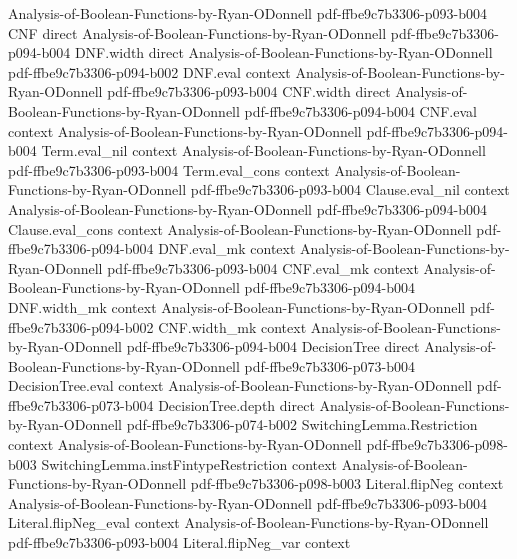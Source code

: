 \begin{theorem}
  {Analysis-of-Boolean-Functions-by-Ryan-ODonnell}
  {pdf-ffbe9c7b3306-p093-b004}
\proofstep
  {CNF}
  {direct}
  {Analysis-of-Boolean-Functions-by-Ryan-ODonnell}
  {pdf-ffbe9c7b3306-p094-b004}
\proofstep
  {DNF.width}
  {direct}
  {Analysis-of-Boolean-Functions-by-Ryan-ODonnell}
  {pdf-ffbe9c7b3306-p094-b002}
\proofstep
  {DNF.eval}
  {context}
  {Analysis-of-Boolean-Functions-by-Ryan-ODonnell}
  {pdf-ffbe9c7b3306-p093-b004}
\proofstep
  {CNF.width}
  {direct}
  {Analysis-of-Boolean-Functions-by-Ryan-ODonnell}
  {pdf-ffbe9c7b3306-p094-b004}
\proofstep
  {CNF.eval}
  {context}
  {Analysis-of-Boolean-Functions-by-Ryan-ODonnell}
  {pdf-ffbe9c7b3306-p094-b004}
\proofstep
  {Term.eval_nil}
  {context}
  {Analysis-of-Boolean-Functions-by-Ryan-ODonnell}
  {pdf-ffbe9c7b3306-p093-b004}
\proofstep
  {Term.eval_cons}
  {context}
  {Analysis-of-Boolean-Functions-by-Ryan-ODonnell}
  {pdf-ffbe9c7b3306-p093-b004}
\proofstep
  {Clause.eval_nil}
  {context}
  {Analysis-of-Boolean-Functions-by-Ryan-ODonnell}
  {pdf-ffbe9c7b3306-p094-b004}
\proofstep
  {Clause.eval_cons}
  {context}
  {Analysis-of-Boolean-Functions-by-Ryan-ODonnell}
  {pdf-ffbe9c7b3306-p094-b004}
\proofstep
  {DNF.eval_mk}
  {context}
  {Analysis-of-Boolean-Functions-by-Ryan-ODonnell}
  {pdf-ffbe9c7b3306-p093-b004}
\proofstep
  {CNF.eval_mk}
  {context}
  {Analysis-of-Boolean-Functions-by-Ryan-ODonnell}
  {pdf-ffbe9c7b3306-p094-b004}
\proofstep
  {DNF.width_mk}
  {context}
  {Analysis-of-Boolean-Functions-by-Ryan-ODonnell}
  {pdf-ffbe9c7b3306-p094-b002}
\proofstep
  {CNF.width_mk}
  {context}
  {Analysis-of-Boolean-Functions-by-Ryan-ODonnell}
  {pdf-ffbe9c7b3306-p094-b004}
\proofstep
  {DecisionTree}
  {direct}
  {Analysis-of-Boolean-Functions-by-Ryan-ODonnell}
  {pdf-ffbe9c7b3306-p073-b004}
\proofstep
  {DecisionTree.eval}
  {context}
  {Analysis-of-Boolean-Functions-by-Ryan-ODonnell}
  {pdf-ffbe9c7b3306-p073-b004}
\proofstep
  {DecisionTree.depth}
  {direct}
  {Analysis-of-Boolean-Functions-by-Ryan-ODonnell}
  {pdf-ffbe9c7b3306-p074-b002}
\proofstep
  {SwitchingLemma.Restriction}
  {context}
  {Analysis-of-Boolean-Functions-by-Ryan-ODonnell}
  {pdf-ffbe9c7b3306-p098-b003}
\proofstep
  {SwitchingLemma.instFintypeRestriction}
  {context}
  {Analysis-of-Boolean-Functions-by-Ryan-ODonnell}
  {pdf-ffbe9c7b3306-p098-b003}
\proofstep
  {Literal.flipNeg}
  {context}
  {Analysis-of-Boolean-Functions-by-Ryan-ODonnell}
  {pdf-ffbe9c7b3306-p093-b004}
\proofstep
  {Literal.flipNeg_eval}
  {context}
  {Analysis-of-Boolean-Functions-by-Ryan-ODonnell}
  {pdf-ffbe9c7b3306-p093-b004}
\proofstep
  {Literal.flipNeg_var}
  {context}

\end{theorem}
